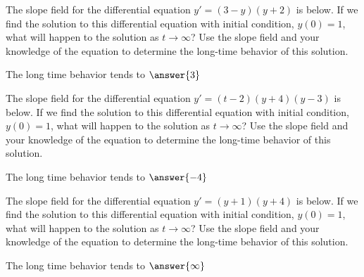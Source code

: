 \documentclass{ximera}
\begin{document}
\begin{exercise}\label{ex:3myyp2}
    The slope field for the differential equation $y' = (3-y)(y+2)$ is below.  If we find the solution to this differential equation with initial condition, $y(0) = 1$, what will happen to the solution as $t \rightarrow \infty$? Use the slope field and your knowledge of the equation to determine the long-time behavior of this solution.
    
    The long time behavior tends to $\answer{3}$
\end{exercise}

\begin{exercise}\label{ex:tm2yp4ym3}
    The slope field for the differential equation $y' = (t-2)(y+4)(y-3)$ is below. If we find the solution to this differential equation with initial condition, $y(0) = 1$, what will happen to the solution as $t \rightarrow \infty$? Use the slope field and your knowledge of the equation to determine the long-time behavior of this solution.
    
    The long time behavior tends to $\answer{-4}$
\end{exercise}

\begin{exercise}\label{ex:yp1yp4}
    The slope field for the differential equation $y' = (y+1)(y+4)$ is below. If we find the solution to this differential equation with initial condition, $y(0) = 1$, what will happen to the solution as $t \rightarrow \infty$? Use the slope field and your knowledge of the equation to determine the long-time behavior of this solution.
    
    The long time behavior tends to $\answer{\infty}$
\end{exercise}

\end{document}

